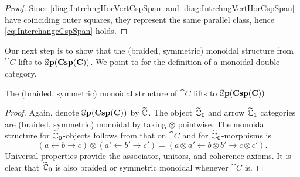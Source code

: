 \documentclass[./1--Catfying_zxCalc--Master.tex]{subfiles} %
\begin{document}
\begin{proof}
	Since \eqref{diag:IntrchngHorVertCspSpan} 
	and \eqref{diag:IntrchngVertHorCspSpan} 
	have coinciding outer squares, 
	they represent the same parallel class,
	hence \eqref{eq:InterchangeCspSpan} holds.
\end{proof}

Our next step is to show that 
the (braided, symmetric) monoidal structure 
from $\cat{C}$ lifts to $\mathbb{S}\mathbf{p(Csp(C))}$.
We point to 
	\cite[Def.~2.9]{Shulman_ConstructSMBicats} 
for the definition of a monoidal double category.

\begin{lem}
	\label{lem:SpanCospanSM}
	The (braided, symmetric) monoidal structure 
	of $\cat{C}$ lifts to $\mathbb{S}\mathbf{p(Csp(C))}$.
\end{lem}

\begin{proof}
	Again, denote 
	$\mathbb{S}\mathbf{p(Csp(C))}$ by $\widetilde{\mathbb{C}}$. 
	The object $\widetilde{\mathbb{C}}_0$ and 
	arrow $\widetilde{\mathbb{C}}_1$ categories are 
	(braided, symmetric) monoidal
	by taking $\otimes$ pointwise.  
	The monoidal structure for 
	$\widetilde{\mathbb{C}}_0$-objects follows 
	from that on $\cat{C}$ and 
	for $\widetilde{\mathbb{C}}_0$-morphisms is
	\[
	(a \gets b \to c) \otimes (a' \gets b' \to c')
	=
	(a\otimes a' \gets b\otimes b' \to c\otimes c').
	\]
	Universal properties provide 
	the associator, unitors, 
	and coherence axioms. 
	It is clear that $\widetilde{\mathbb{C}}_0$ is 
	also braided or symmetric monoidal 
	whenever $\cat{C}$ is.
	

\end{proof}
\end{document}
